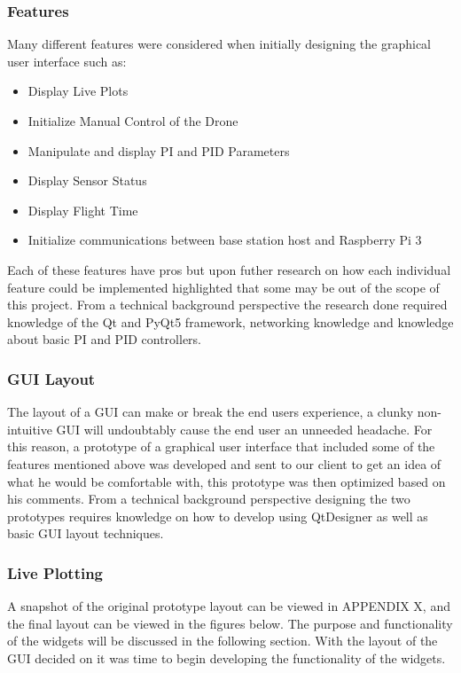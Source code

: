 \subsubsection{Features}
Many different features were considered when initially designing the graphical user interface such as: 
\begin{itemize}
	\item Display Live Plots 
	\item Initialize Manual Control of the Drone
	\item Manipulate and display PI and PID Parameters
	\item Display Sensor Status
	\item Display Flight Time
	\item Initialize communications between base station host and Raspberry Pi 3
\end{itemize}
Each of these features have pros but upon futher research on how each individual feature could be implemented highlighted that some may be out of the scope of this project. From a technical background perspective the research done required knowledge of the Qt and PyQt5 framework, networking knowledge and knowledge about basic PI and PID controllers.  

\subsubsection{GUI Layout}  
The layout of a GUI can make or break the end users experience, a clunky non-intuitive GUI will undoubtably cause the end user an unneeded headache. For this reason, a prototype of a graphical user interface that included some of the features mentioned above was developed and sent to our client to get an idea of what he would be comfortable with, this prototype was then optimized based on his comments. From a technical background perspective designing the two prototypes requires knowledge on how to develop using QtDesigner as well as basic GUI layout techniques. 

\subsubsection{Live Plotting}
A snapshot of the original prototype layout can be viewed in APPENDIX X, and the final layout can be viewed in the figures below. The purpose and functionality of the widgets will be discussed in the following section. With the layout of the GUI decided on it was time to begin developing the functionality of the widgets.

